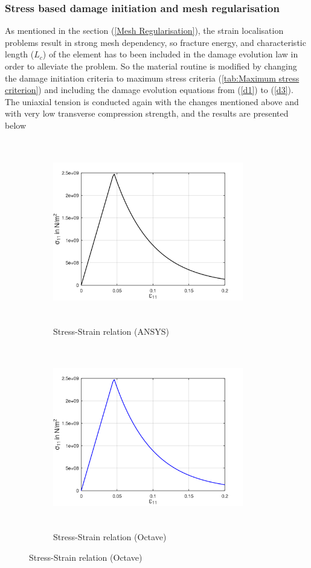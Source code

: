 \documentclass[a4paper,12pt,twoside]{report}
\begin{document}
\subsubsection{Stress based damage initiation and mesh regularisation}
\indent\indent\indent As mentioned in the section (\ref{Mesh Regularisation}), the strain localisation problems result in strong mesh dependency, so fracture energy, and characteristic length ($L_{c}$) of the element has to been included in the damage evolution law in order to alleviate the problem. So the material routine is modified by changing the damage initiation criteria to maximum stress criteria (\ref{tab:Maximum stress criterion}) and including the damage evolution equations from (\ref{d1}) to (\ref{d3}). The uniaxial tension is conducted again with the changes mentioned above and with very low transverse compression strength, and the results are presented below
\begin{figure}[htbp!]
     \captionsetup[subfigure]{justification=centering}
     \begin{subfigure}{0.4\textwidth}
         \includegraphics[width=8.3cm,height=8cm,keepaspectratio]{22.StressvsStrain_Ansys.png}
         \caption{Stress-Strain relation (ANSYS)}
         \label{fig:Stress-Strain relation in Ansys2}
     \end{subfigure}
     \hspace{1.8cm}
     \begin{subfigure}{0.4\textwidth}
          \includegraphics[width=8.3cm,height=8cm,keepaspectratio]{22.StressvsStrain_Octave.png}
         \caption{Stress-Strain relation (Octave)}
         \label{fig:Stress-Strain relation Octave2}
     \end{subfigure}
\end{figure}
\end{document}

